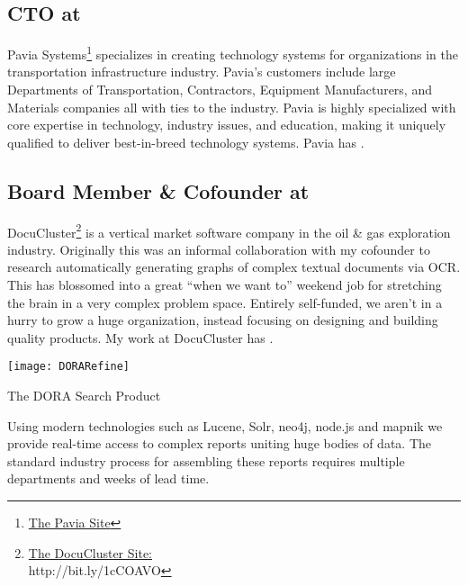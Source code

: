 \subsection{\textbf{CTO} at  \shyears{[2015-PRESENT]}}
Pavia Systems\footnote{\href{http://www.paviasystems.com/}{The Pavia Site}} specializes in creating technology systems for organizations in the transportation infrastructure industry.  Pavia's customers include large Departments of Transportation, Contractors, Equipment Manufacturers, and Materials companies all with ties to the industry.  Pavia is highly specialized with core expertise in technology, industry issues, and education, making it uniquely qualified to deliver best-in-breed technology systems.  Pavia has .

\subsection{\textbf{Board Member \& Cofounder} at  \shyears{[2011-PRESENT]}}
DocuCluster\footnote{\href{http://www.docucluster.com/}{The DocuCluster Site:}\\http://bit.ly/1cCOAVO} is a vertical market software company in the oil \& gas exploration industry.  Originally this was an informal collaboration with my cofounder to research automatically generating graphs of complex textual documents via OCR.  This has blossomed into a great ``when we want to'' weekend job for stretching the brain in a very complex problem space.  Entirely self-funded, we aren't in a hurry to grow a huge organization, instead focusing on designing and building quality products.  My work at DocuCluster has .
\begin{marginfigure}%
  \texttt{[image: DORARefine]}
  \caption{The DORA Search Product}
  \label{fig:DoraProduct}
\end{marginfigure}

Using modern technologies such as Lucene, Solr, neo4j, node.js and mapnik we provide real-time access to complex reports uniting huge bodies of data.  The standard industry process for assembling these reports requires multiple departments and weeks of lead time.

